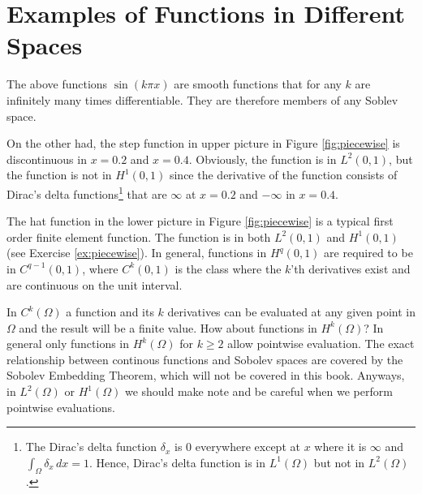 \section{Examples of Functions in Different Spaces}

The above functions $\sin(k \pi x)$ are smooth functions
that for any $k$ are infinitely many times differentiable. 
They are therefore members of any Soblev space. 

On the other had, the step function in upper picture in Figure \ref{fig:piecewise} is 
discontinuous in $x=0.2$ and $x=0.4$. Obviously, the function is in $L^2(0,1)$, but 
the function is not in $H^1(0,1)$ since the derivative of the function  consists of Dirac's 
delta functions\footnote{The Dirac's delta function $\delta_x$ is 0 everywhere except at 
$x$ where it is  $\infty$ and $\int_\Omega \delta_x \, dx = 1$. Hence, 
Dirac's delta function is in $L^1(\Omega)$ but not in $L^2(\Omega)$.  
} 
that are $\infty$ at $x=0.2$ and 
$-\infty$ in $x=0.4$. 

The hat function in the lower picture in Figure \ref{fig:piecewise} is a typical
first order finite element function. The function is in both $L^2(0,1)$ and $H^1(0,1)$ (see
Exercise \ref{ex:piecewise}).         
In general, functions in $H^q(0,1)$ are required to be in $C^{q-1}(0,1)$, where $C^k(0,1)$ is the
class  where the $k$'th derivatives exist and
are continuous on the unit interval.   

\begin{remark}
In $C^k(\Omega)$ a function and its $k$ derivatives can be evaluated at any given point in $\Omega$ and  
the result will be a finite value. How about functions in $H^k(\Omega)$? In general only functions
in $H^k(\Omega)$ for $k\ge 2$ allow pointwise evaluation. The exact relationship between 
continous functions and Sobolev spaces are covered by the  Sobolev Embedding Theorem, which will not 
be covered in this book. 
Anyways, in $L^2(\Omega)$ or $H^1(\Omega)$ we should make note and be careful when we perform pointwise evaluations. 
\end{remark}


